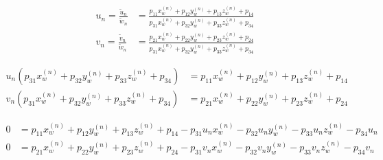 \begin{align*}
    u_n = \frac{\widetilde{u}_n}{\widetilde{w}_n} & = \frac{p_{11}x_w^{(n)} + p_{12}y_w^{(n)} + p_{13}z_w^{(n)} + p_{14}}{p_{31}x_w^{(n)} + p_{32}y_w^{(n)} + p_{33}z_w^{(n)} + p_{34}} \\
    v_n = \frac{\widetilde{v}_n}{\widetilde{w}_n} & = \frac{p_{21}x_w^{(n)} + p_{22}y_w^{(n)} + p_{23}z_w^{(n)} + p_{24}}{p_{31}x_w^{(n)} + p_{32}y_w^{(n)} + p_{33}z_w^{(n)} + p_{34}}
\end{align*}

\begin{align*}
    u_n(p_{31}x_w^{(n)} + p_{32}y_w^{(n)} + p_{33}z_w^{(n)} + p_{34}) & = p_{11}x_w^{(n)} + p_{12}y_w^{(n)} + p_{13}z_w^{(n)} + p_{14} \\
    v_n(p_{31}x_w^{(n)} + p_{32}y_w^{(n)} + p_{33}z_w^{(n)} + p_{34}) & = p_{21}x_w^{(n)} + p_{22}y_w^{(n)} + p_{23}z_w^{(n)} + p_{24}
\end{align*}

\begin{subequations}
    \begin{align}
        0 & = p_{11}x_w^{(n)} + p_{12}y_w^{(n)} + p_{13}z_w^{(n)} + p_{14} - p_{31}u_nx_w^{(n)} - p_{32}u_ny_w^{(n)} - p_{33}u_nz_w^{(n)} - p_{34}u_n \\
        0 & = p_{21}x_w^{(n)} + p_{22}y_w^{(n)} + p_{23}z_w^{(n)} + p_{24} - p_{31}v_nx_w^{(n)} - p_{32}v_ny_w^{(n)} - p_{33}v_nz_w^{(n)} - p_{34}v_n
    \end{align}
\end{subequations}



